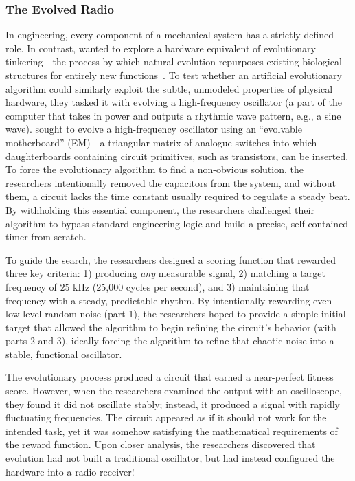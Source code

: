 \subsubsection{The Evolved Radio~\citep{BirdRadio}}
\label{sec:radio}


In engineering, every component of a mechanical system has a strictly defined role. 
In contrast, \citeauthor{BirdRadio} wanted to explore a hardware equivalent of evolutionary tinkering---the process by which natural evolution repurposes existing biological structures for entirely new functions~\citep{Jacob1982evolutiontinker}. 
To test whether an artificial evolutionary algorithm could similarly exploit the subtle, unmodeled properties of physical hardware, they tasked it with evolving a high-frequency oscillator (a part of the computer that takes in power and outputs a rhythmic wave pattern, e.g., a sine wave).
\citeauthor{BirdRadio} sought to evolve a high-frequency oscillator using an ``evolvable motherboard'' (EM)---a triangular matrix of analogue switches into which daughterboards containing circuit primitives, such as transistors, can be inserted. 
To force the evolutionary algorithm to find a non-obvious solution, the researchers intentionally removed the capacitors from the system, and without them, a circuit lacks the time constant usually required to regulate a steady beat.
By withholding this essential component, the researchers challenged their algorithm to bypass standard engineering logic and build a precise, self-contained timer from scratch.

To guide the search, the researchers designed a scoring function that rewarded three key criteria: 1) producing \emph{any} measurable signal, 2) matching a target frequency of $25\text{ kHz}$ (25,000 cycles per second), and 3) maintaining that frequency with a steady, predictable rhythm. 
By intentionally rewarding even low-level random noise (part 1), the researchers hoped to provide a simple initial target that allowed the algorithm to begin refining the circuit's behavior (with parts 2 and 3), ideally forcing the algorithm to refine that chaotic noise into a stable, functional oscillator.

The evolutionary process produced a circuit that earned a near-perfect fitness score. 
However, when the researchers examined the output with an oscilloscope, they found it did not oscillate stably; instead, it produced a signal with rapidly fluctuating frequencies. 
The circuit appeared as if it should not work for the intended task, yet it was somehow satisfying the mathematical requirements of the reward function.  
Upon closer analysis, the researchers discovered that evolution had not built a traditional oscillator, but had instead configured the hardware into a radio receiver! 

